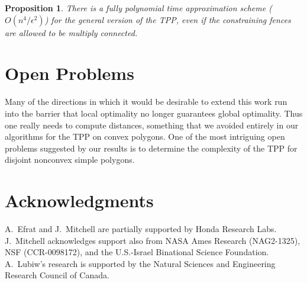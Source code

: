 \documentclass[11pt]{article}
\newtheorem{proposition}{Proposition}
\begin{document}
\begin{proposition}
There is a fully polynomial time approximation scheme (~\(O(n^4/\epsilon^2)\)) for the general version of the TPP, even if the constraining fences are allowed to be multiply connected.
\end{proposition}

\section{Open Problems}

Many of the directions in which it would be desirable to extend this work run into the barrier that local optimality no longer guarantees global optimality.
Thus one really needs to compute distances, something that we avoided entirely in our algorithms for the TPP on convex polygons.
One of the most intriguing open problems suggested by our results is to determine the complexity of the TPP for disjoint nonconvex simple polygons.

\section{Acknowledgments}

A.\ Efrat and J.\ Mitchell are partially supported by Honda Research Labs.
J.\ Mitchell acknowledges support also from NASA Ames Research (NAG2-1325), NSF (CCR-0098172), and the U.S.-Israel Binational Science Foundation.
A.\ Lubiw's research is supported by the Natural Sciences and Engineering Research Council of Canada.
\end{document}
